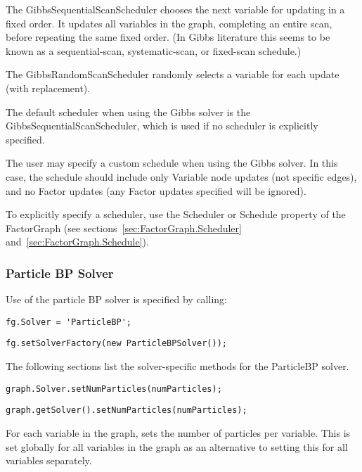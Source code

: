 The GibbsSequentialScanScheduler chooses the next variable for updating in a fixed order. It updates all variables in the graph, completing an entire scan, before repeating the same fixed order. (In Gibbs literature this seems to be known as a sequential-scan, systematic-scan, or fixed-scan schedule.)

The GibbsRandomScanScheduler randomly selects a variable for each update (with replacement).

The default scheduler when using the Gibbs solver is the GibbsSequentialScanScheduler, which is used if no scheduler is explicitly specified.

The user may specify a custom schedule when using the Gibbs solver.  In this case, the schedule should include only Variable node updates (not specific edges), and no Factor updates (any Factor updates specified will be ignored).

To explicitly specify a scheduler, use the Scheduler or Schedule property of the FactorGraph (see sections~\ref{sec:FactorGraph.Scheduler} and~\ref{sec:FactorGraph.Schedule}).


\subsubsection{Particle BP Solver}

Use of the particle BP solver is specified by calling:

\ifmatlab
\begin{lstlisting}
fg.Solver = 'ParticleBP';
\end{lstlisting}
\fi

\ifjava
\begin{lstlisting}
fg.setSolverFactory(new ParticleBPSolver());
\end{lstlisting}
\fi

The following sections list the solver-specific methods for the ParticleBP solver.


\ifmatlab
\begin{lstlisting}
graph.Solver.setNumParticles(numParticles);
\end{lstlisting}
\fi

\ifjava
\begin{lstlisting}
graph.getSolver().setNumParticles(numParticles);
\end{lstlisting}
\fi

For each variable in the graph, sets the number of particles per variable. This is set globally for all variables in the graph as an alternative to setting this for all variables separately.

